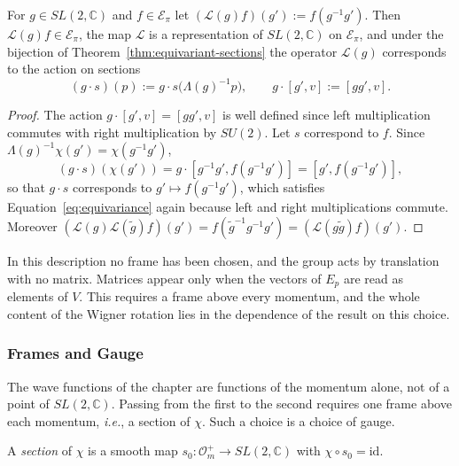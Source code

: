 \begin{proposition}\label{prop:action-equivariant}
	For $g\in SL(2,\mathbb{C})$ and $f\in\mathcal{E}_\pi$ let $(\mathcal{L}(g)f)(g'):=f(g^{-1}g')$. Then $\mathcal{L}(g)f\in\mathcal{E}_\pi$, the map $\mathcal{L}$ is a representation of $SL(2,\mathbb{C})$ on $\mathcal{E}_\pi$, and under the bijection of Theorem~\ref{thm:equivariant-sections} the operator $\mathcal{L}(g)$ corresponds to the action on sections
	\begin{equation*}
		(g\cdot s)(p):=g\cdot s\big(\Lambda(g)^{-1}p\big),\qquad g\cdot[g',v]:=[gg',v].
	\end{equation*}
\end{proposition}

\begin{proof}
	The action $g\cdot[g',v]=[gg',v]$ is well defined since left multiplication commutes with right multiplication by $SU(2)$. Let $s$ correspond to $f$. Since $\Lambda(g)^{-1}\chi(g')=\chi(g^{-1}g')$,
	\begin{equation*}
		(g\cdot s)(\chi(g'))=g\cdot[g^{-1}g',f(g^{-1}g')]=[g',f(g^{-1}g')],
	\end{equation*}
	so that $g\cdot s$ corresponds to $g'\mapsto f(g^{-1}g')$, which satisfies Equation~\eqref{eq:equivariance} again because left and right multiplications commute. Moreover $(\mathcal{L}(g)\mathcal{L}(\tilde{g})f)(g')=f(\tilde{g}^{-1}g^{-1}g')=(\mathcal{L}(g\tilde{g})f)(g')$.
\end{proof}

\begin{remark}
	In this description no frame has been chosen, and the group acts by translation with no matrix. Matrices appear only when the vectors of $E_p$ are read as elements of $V$. This requires a frame above every momentum, and the whole content of the Wigner rotation lies in the dependence of the result on this choice.
\end{remark}

\subsubsection*{Frames and Gauge}

The wave functions of the chapter are functions of the momentum alone, not of a point of $SL(2,\mathbb{C})$. Passing from the first to the second requires one frame above each momentum, \textit{i.e.}, a section of $\chi$. Such a choice is a choice of gauge.

\begin{definition}\label{def:section-principal}
	A \emph{section} of $\chi$ is a smooth map $s_0:\mathcal{O}_m^+\to SL(2,\mathbb{C})$ with $\chi\circ s_0=\mathrm{id}$.
\end{definition}

